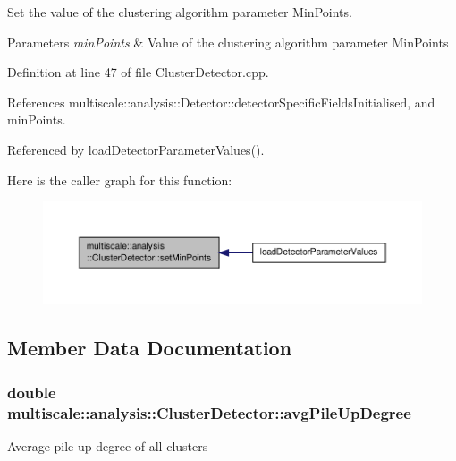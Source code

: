 Set the value of the clustering algorithm parameter Min\-Points. 


\begin{DoxyParams}{Parameters}
{\em min\-Points} & Value of the clustering algorithm parameter Min\-Points \\
\hline
\end{DoxyParams}


Definition at line 47 of file Cluster\-Detector.\-cpp.



References multiscale\-::analysis\-::\-Detector\-::detector\-Specific\-Fields\-Initialised, and min\-Points.



Referenced by load\-Detector\-Parameter\-Values().



Here is the caller graph for this function\-:\nopagebreak
\begin{figure}[H]
\begin{center}
\leavevmode
\includegraphics[width=350pt]{classmultiscale_1_1analysis_1_1ClusterDetector_a190fd17d121e8c22c1ca6e4f5b7a213c_icgraph}
\end{center}
\end{figure}




\subsection{Member Data Documentation}
\hypertarget{classmultiscale_1_1analysis_1_1ClusterDetector_a6f6cfa50cf21ac400d41d6c6f2112bc9}{
\subsubsection[{avg\-Pile\-Up\-Degree}]{\setlength{\rightskip}{0pt plus 5cm}double multiscale\-::analysis\-::\-Cluster\-Detector\-::avg\-Pile\-Up\-Degree\hspace{0.3cm}{\ttfamily [protected]}}}\label{classmultiscale_1_1analysis_1_1ClusterDetector_a6f6cfa50cf21ac400d41d6c6f2112bc9}
Average pile up degree of all clusters 

